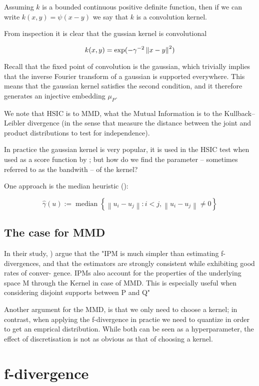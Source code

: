 Assuming $k$ is a bounded continuous positive definite function, then if we can write
$k(x, y) = \psi (x - y)$ we say that $k$ is a convolution kernel.

From inspection it is clear that the gussian kernel is convolutional

$$
    k(x, y) = \exp (-\gamma^{-2}\left\lVert x - y\right\rVert^2)
$$

Recall that the fixed point of convolution is the gaussian, which trivially implies
that the inverse Fourier transform of a gaussian is supported everywhere. 
 This means that the gaussian kernel satisfies the second
condition, and it therefore generates an injective embedding $\mu_P$.

We note that HSIC is to MMD, what the Mutual Information is to the Kullback–Leibler divergence (in the 
sense that measure the distance between the joint and product distributions to test for independence).

In practice the gaussian kernel is very popular, it is used in the HSIC test when used as a
score function by \cite{Mooij2016jmlr}; but how do we find the parameter -- sometimes referred to 
as the bandwith -- of the kernel?

One approach is the median heuristic (\cite{scholkopf2002learning}):

$$
\hat{\gamma}(u):=\operatorname{median}\left\{\left\|u_{i}-u_{j}\right\|:  i<j ,\left\|u_{i}-u_{j}\right\| \neq 0\right\}
$$

\subsection{The case for MMD}

In their study, \cite{sriperumbudur2009integral}) argue that the "IPM is much
simpler than estimating f-divergences, and that the estimators
are strongly consistent while exhibiting good rates of conver-
gence. IPMs also account for the properties of
the underlying space M through the Kernel in case of MMD. This is especially
useful when considering disjoint supports between P and Q"

Another argument for the MMD, is that we only need to choose a kernel; in contrast, 
when applying the f-divergence in practie we need to quantize in order to get an 
emprical distribution. While both can be seen as a hyperparameter, the effect of 
discretisation is not as obvious as that of choosing a kernel. 

\section{f-divergence}

